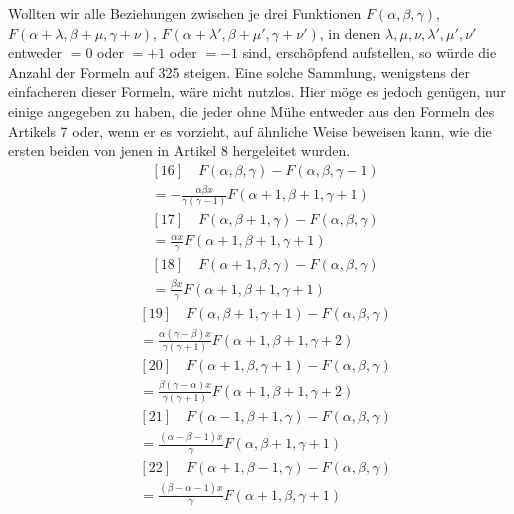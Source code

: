 Wollten wir alle Beziehungen zwischen je drei Funktionen $F(\alpha,\beta,\gamma)$, $F(\alpha+\lambda,\beta+\mu,\gamma+\nu)$, $F(\alpha+\lambda',\beta+\mu',\gamma+\nu')$, in denen $\lambda,\mu,\nu,\lambda',\mu',\nu'$ entweder $=0$ oder $=+1$ oder $=-1$ sind, erschöpfend aufstellen, so würde die Anzahl der Formeln auf 325 steigen. Eine solche Sammlung, wenigstens der einfacheren dieser Formeln, wäre nicht nutzlos. Hier möge es jedoch genügen, nur einige angegeben zu haben, die jeder ohne Mühe entweder aus den Formeln des Artikels 7 oder, wenn er es vorzieht, auf ähnliche Weise beweisen kann, wie die ersten beiden von jenen in Artikel 8 hergeleitet wurden.
\[
\begin{aligned}&[16]\quad F(\alpha,\beta,\gamma)-F(\alpha,\beta,\gamma-1)\\&{}=-\frac{\alpha\beta x}{\gamma(\gamma-1)}F(\alpha+1,\beta+1,\gamma+1)
\end{aligned}
\]
\[
\begin{aligned}&[17]\quad F(\alpha,\beta+1,\gamma)-F(\alpha,\beta,\gamma)\\&{}=\frac{\alpha x}{\gamma}F(\alpha+1,\beta+1,\gamma+1)
\end{aligned}
\]
\[
\begin{aligned}&[18]\quad F(\alpha+1,\beta,\gamma)-F(\alpha,\beta,\gamma)\\&{}=\frac{\beta x}{\gamma}F(\alpha+1,\beta+1,\gamma+1)
\end{aligned}
\]
\[
\begin{aligned}&[19]\quad F(\alpha,\beta+1,\gamma+1)-F(\alpha,\beta,\gamma)\\&{}=\frac{\alpha(\gamma-\beta)x}{\gamma(\gamma+1)}F(\alpha+1,\beta+1,\gamma+2)
\end{aligned}
\]
\[
\begin{aligned}&[20]\quad F(\alpha+1,\beta,\gamma+1)-F(\alpha,\beta,\gamma)\\&{}=\frac{\beta(\gamma-\alpha)x}{\gamma(\gamma+1)}F(\alpha+1,\beta+1,\gamma+2)
\end{aligned}
\]
\[
\begin{aligned}&[21]\quad F(\alpha-1,\beta+1,\gamma)-F(\alpha,\beta,\gamma)\\&{}=\frac{(\alpha-\beta-1)x}{\gamma}F(\alpha,\beta+1,\gamma+1)
\end{aligned}
\]
\[
\begin{aligned}&[22]\quad F(\alpha+1,\beta-1,\gamma)-F(\alpha,\beta,\gamma)\\&{}=\frac{(\beta-\alpha-1)x}{\gamma}F(\alpha+1,\beta,\gamma+1)
\end{aligned}
\]
